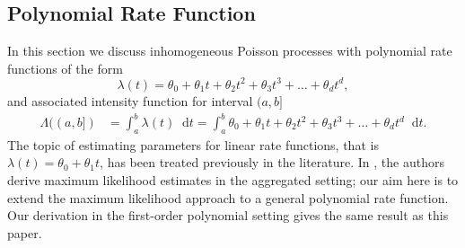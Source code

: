 \documentclass[11pt,a4,twosided,singlespacing,titlepagenumber=on,numbers=endperiod]{scrreprt}
\numberwithin{equation}{chapter} %
\theoremstyle{remark}
\newcommand*{\diff}{\mathop{}\!\mathrm{d}}  %
\begin{document}
\subsection{Polynomial Rate Function}
In this section we discuss inhomogeneous Poisson processes with polynomial rate functions of the form
\begin{equation}\label{eq:poly_rate}
	\lambda(t) = \theta_0 + \theta_1t + \theta_2t^2 + \theta_3t^3 + \dots + \theta_dt^d,
\end{equation}
and associated intensity function for interval $(a, b]$
\begin{equation}\label{eq:poly_intensity}
	\begin{aligned}
		\Lambda((a,b]) &= \int_a^b \lambda(t) \diff t = \int_a^b \theta_0 + \theta_1t + \theta_2t^2 + \theta_3t^3 + \dots + \theta_dt^d \diff t.
	\end{aligned}
\end{equation}
The topic of estimating parameters for linear rate functions, that is $\lambda(t) = \theta_0 + \theta_1 t$, has been treated previously in the literature. In \cite{nhpp_linear}, the authors derive maximum likelihood estimates in the aggregated setting; our aim here is to extend the maximum likelihood approach to a general polynomial rate function. Our derivation in the first-order polynomial setting gives the same result as this paper.
\end{document}
